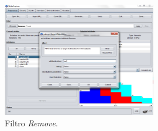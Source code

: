 \documentclass[a4paper, 11pt]{exam}
\begin{document}
\begin{figure}[h]
	\centering
	\includegraphics[width=0.6\textwidth]{iris_sin_class.png}
	\caption{Filtro \textit{Remove}.}
	\label{Figura_2}
\end{figure}

\newpage
\end{document}
